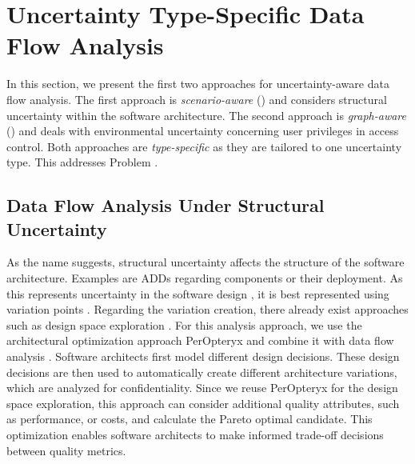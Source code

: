 \section{Uncertainty Type-Specific Data Flow Analysis}%
\label{sec:confidentialityanalysis:typespecifc}

In this section, we present the first two approaches for uncertainty-aware data flow analysis.
The first approach is \emph{scenario-aware} () and considers structural uncertainty within the software architecture.
The second approach is \emph{graph-aware} () and deals with environmental uncertainty concerning user privileges in access control.
Both approaches are \emph{type-specific} as they are tailored to one uncertainty type.
This addresses Problem .


\subsection{Data Flow Analysis Under Structural Uncertainty}%
\label{sec:confidentialityanalysis:structural}

As the name suggests, structural uncertainty affects the structure of the software architecture.
Examples are \acfp{ADD} regarding components or their deployment.
As this represents uncertainty in the software design \cite{mcconnell_software_1998}, it is best represented using variation points \cite{troya_uncertainty_2021}.
Regarding the variation creation, there already exist approaches such as design space exploration \cite{sobhy_evaluation_2021}.
For this analysis approach, we use the architectural optimization approach PerOpteryx \cite{koziolek_automated_2011,koziolek_performance_2010,koziolek_peropteryx_2011,martens_automatically_2010} and combine it with data flow analysis \cite{seifermann_detecting_2022}.
Software architects first model different design decisions. 
These design decisions are then used to automatically create different architecture variations, which are analyzed for confidentiality.
Since we reuse PerOpteryx for the design space exploration, this approach can consider additional quality attributes, such as performance, or costs, and calculate the Pareto optimal candidate.
This optimization enables software architects to make informed trade-off decisions between quality metrics.

